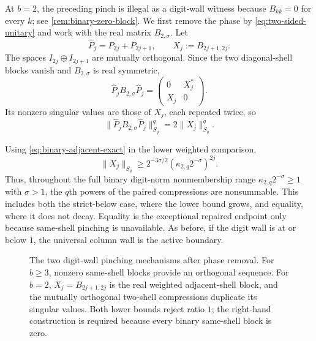 At \(b=2\), the preceding pinch is illegal as a digit-wall witness because
\(B_{kk}=0\) for every \(k\); see \cref{rem:binary-zero-block}.  We first
remove the phase by \cref{eq:two-sided-unitary} and work with the real
matrix \(B_{2,\sigma}\).  Let
\[
  \widehat P_j=P_{2j}+P_{2j+1},
  \qquad
  X_j:=B_{2j+1,2j}.
\]
The spaces \(I_{2j}\oplus I_{2j+1}\) are mutually orthogonal.  Since the
two diagonal-shell blocks vanish and \(B_{2,\sigma}\) is real symmetric,
\begin{equation}
  \widehat P_jB_{2,\sigma}\widehat P_j
  =
  \begin{pmatrix}
    0&X_j^*\\
    X_j&0
  \end{pmatrix}.
  \label{eq:binary-pair-block}
\end{equation}
Its nonzero singular values are those of \(X_j\), each repeated twice, so
\begin{equation}
  \|\widehat P_jB_{2,\sigma}\widehat P_j\|_{S_q}^q
  =2\|X_j\|_{S_q}^q.
  \label{eq:binary-double-sv}
\end{equation}

Using \cref{eq:binary-adjacent-exact} in the lower weighted comparison,
\begin{equation}
  \|X_j\|_{S_q}
  \ge
  2^{-3\sigma/2}
  (\kappa_{2,q}2^{-\sigma})^{2j}.
  \label{eq:binary-pair-lower}
\end{equation}
Thus, throughout the full binary digit-norm nonmembership range
\(\kappa_{2,q}2^{-\sigma}\ge1\) with \(\sigma>1\), the \(q\)th powers of
the paired compressions are nonsummable.  This includes both the
strict-below case, where the lower bound grows, and equality, where it
does not decay.  Equality is the exceptional repaired endpoint only
because same-shell pinching is unavailable.  As before, if the digit wall
is at or below \(1\), the universal column wall is the active boundary.

\begin{figure}[t]
  \centering
  \resizebox{\textwidth}{!}{}
  \caption{The two digit-wall pinching mechanisms after phase removal.  For
  \(b\ge3\), nonzero same-shell blocks provide an orthogonal sequence.  For
  \(b=2\), \(X_j=B_{2j+1,2j}\) is the real weighted adjacent-shell block,
  and the mutually orthogonal two-shell compressions duplicate its
  singular values.  Both lower bounds reject ratio \(1\); the right-hand
  construction is required because every binary same-shell block is zero.}
  \label{fig:pinching-comparison}
\end{figure}

